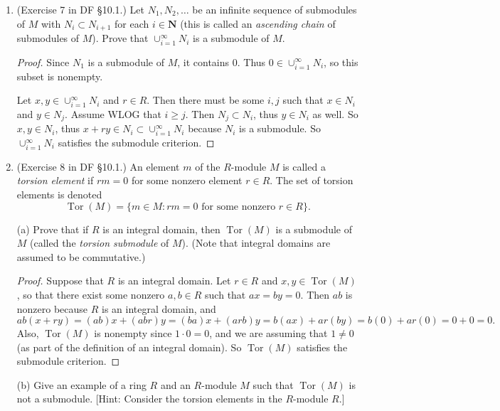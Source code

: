 \documentclass[10pt]{article}
\DeclareMathOperator*{\Tor}{Tor}
\begin{document}
\begin{enumerate}
\begin{proof}
\noindent Note: We have used the fact here that $r \cdot 0 = 0$ for all $r \in R$.  To prove this, assume that $r \cdot 0 = m \in M$.  Then $r \cdot 0 = r \cdot (m-m) = r\cdot m + (-r)\cdot m = r \cdot m - r \cdot m = 0$.
\end{proof}

\item (Exercise 7 in DF \S 10.1.) Let $N_1, N_2, \ldots$ be an infinite sequence of submodules of $M$ with $N_i \subset N_{i+1}$ for each $i \in \mathbf{N}$ (this is called an \emph{ascending chain} of submodules of $M$).  Prove that $\cup_{i=1}^\infty N_i$ is a submodule of $M$.

\begin{proof}
Since $N_1$ is a submodule of $M$, it contains $0$.  Thus $0 \in \cup_{i=1}^\infty N_i$, so this subset is nonempty.

Let $x,y \in \cup_{i=1}^\infty N_i$ and $r \in R$.  Then there must be some $i,j$ such that $x \in N_i$ and $y \in N_j$.  Assume WLOG that $i \geq j$.  Then $N_j \subset N_i$, thus $y \in N_i$ as well.  So $x,y \in N_i$, thus $x + ry \in N_i \subset \cup_{i=1}^\infty N_i$ because $N_i$ is a submodule.  So $\cup_{i=1}^\infty N_i$ satisfies the submodule criterion.
\end{proof}

\item (Exercise 8 in DF \S 10.1.) An element $m$ of the $R$-module $M$ is called a \emph{torsion element} if $rm=0$ for some nonzero element $r \in R$.  The set of torsion elements is denoted \[ \Tor(M) = \{m \in M: rm=0 \text{ for some nonzero } r \in R\}  \text{.}\]

(a) Prove that if $R$ is an integral domain, then $\Tor(M)$ is a submodule of $M$ (called the \emph{torsion submodule} of $M$).  (Note that integral domains are assumed to be commutative.)

\begin{proof}
Suppose that $R$ is an integral domain.  Let $r \in R$ and $x,y \in \Tor(M)$, so that there exist some nonzero $a,b \in R$ such that $ax = by = 0$.  Then $ab$ is nonzero because $R$ is an integral domain, and $$
ab(x+ry) = (ab)x + (abr)y = (ba)x + (arb)y = b(ax) + ar(by) = b(0) + ar(0) = 0 + 0 = 0.
$$
Also, $\Tor(M)$ is nonempty since $1 \cdot 0 = 0$, and we are assuming that $1 \neq 0$ (as part of the definition of an integral domain).  So $\Tor(M)$ satisfies the submodule criterion.
\end{proof}

(b) Give an example of a ring $R$ and an $R$-module $M$ such that $\Tor(M)$ is not a submodule.  [Hint: Consider the torsion elements in the $R$-module $R$.]


\end{enumerate}
\end{document}
